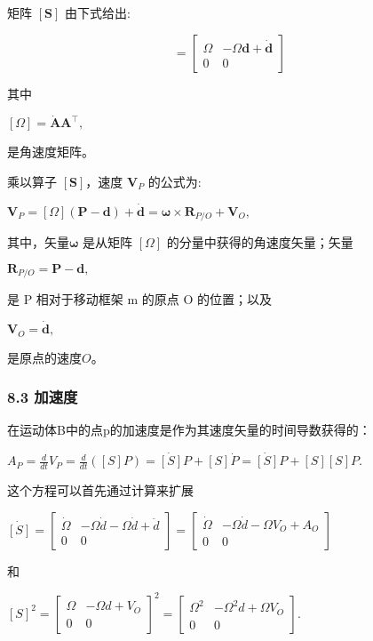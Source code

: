 矩阵 $[\mathbf{S}]$ 由下式给出:

\begin{equation}
[\mathbf{S}] = 
\begin{bmatrix}
\Omega & -\Omega \mathbf{d} + \dot{\mathbf{d}} \\
0 & 0 
\end{bmatrix}~
\end{equation}

其中

$[\Omega] = \dot{\mathbf{A}} \mathbf{A}^{\top},$

是角速度矩阵。

乘以算子 $[\mathbf{S}]$，速度 $\mathbf{V}_P$ 的公式为:

$\mathbf{V}_P = [\Omega](\mathbf{P} - \mathbf{d}) + \dot{\mathbf{d}} = \boldsymbol{\omega} \times \mathbf{R}_{P/O} +\mathbf{V}_O,$

其中，矢量$\boldsymbol{\omega}$ 是从矩阵 $[\Omega]$ 的分量中获得的角速度矢量；矢量

$\mathbf{R}_{P/O} = \mathbf{P} - \mathbf{d},$

是 P 相对于移动框架 m 的原点 O 的位置；以及

$\mathbf{V}_O = \dot{\mathbf{d}},$

是原点的速度$O$。

\subsubsection{8.3 加速度}

在运动体B中的点p的加速度是作为其速度矢量的时间导数获得的：

$A_P = \frac{d}{dt} V_P = \frac{d}{dt} \left( [S]P \right) = \dot{[S]} P + [S] \dot{P} = \dot{[S]} P + [S] [S] P.$

这个方程可以首先通过计算来扩展

$\dot{[S]} = \begin{bmatrix}
\dot{\Omega} & -\Omega \dot{d}  -\Omega \dot{d}+ \ddot{d} \\
0 & 0
\end{bmatrix} = \begin{bmatrix}
\dot{\Omega} & -\Omega \dot{d} - \Omega V_O + A_O \\
0 & 0
\end{bmatrix}$

和

$[S]^2 = \begin{bmatrix}
\Omega & -\Omega d + V_O \\
0 & 0
\end{bmatrix}^2 = \begin{bmatrix}
\Omega^2 & -\Omega^2 d + \Omega V_O \\
0 & 0
\end{bmatrix}.$


